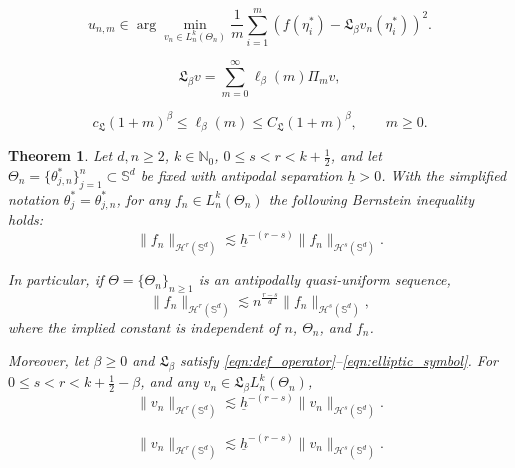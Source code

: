\documentclass[10pt,a4paper]{amsart}
\newtheorem{theorem}{Theorem}
\def\NN{\mathbb{N}}
\def\SS{\mathbb{S}}
\def\sul{\sum\limits}
\begin{document}
\begin{equation}\label{eqn_def_collocation}
u_{n,m}\in\arg\min_{v_n\in L_n^k(\Theta_n)}\frac1m\sum_{i=1}^m\left(f(\eta_i^*)-\mathfrak L_\beta v_n(\eta_i^*)\right)^2.
\end{equation}

\begin{equation}\label{eqn:def_operator}
\mathfrak L_\beta v=\sul_{m=0}^\infty\ell_\beta(m)\Pi_m v,
\end{equation}

\begin{equation}\label{eqn:elliptic_symbol}
c_{\mathfrak L}(1+m)^\beta\leq\ell_\beta(m)\leq C_{\mathfrak L}(1+m)^\beta,\qquad m\geq0.
\end{equation}

\begin{theorem}\label{thm:inverse}
    Let $d,n\geq2$, $k\in\NN_0$, $0\leq s<r< k+\frac{1}{2}$, and let $\Theta_n=\{\theta_{j,n}^*\}_{j=1}^n\subset\SS^d$ be fixed with antipodal separation $\underline h>0$. With the simplified notation $\theta_j^*=\theta_{j,n}^*$, for any $f_n\in L_n^k(\Theta_n)$ the following Bernstein inequality holds:
    \begin{equation}
        \|f_n\|_{\mathcal{H}^r(\SS^d)}\lesssim \underline{h}^{-(r-s)}\|f_n\|_{\mathcal{H}^s(\SS^d)}.
    \end{equation}
    
    In particular, if $\Theta=\{\Theta_n\}_{n\ge1}$ is an antipodally quasi-uniform sequence,
    \begin{equation}
        \|f_n\|_{\mathcal{H}^r(\SS^d)}\lesssim n^{\frac{r-s}{d}}\|f_n\|_{\mathcal{H}^s(\SS^d)},
    \end{equation}
    where the implied constant is independent of $n$, $\Theta_n$, and $f_n$.

    Moreover, let $\beta\geq0$ and $\mathfrak L_\beta$ satisfy \eqref{eqn:def_operator}--\eqref{eqn:elliptic_symbol}. For $0\leq s<r< k+\frac{1}{2}-\beta$, and any $v_n\in\mathfrak{L}_\beta L_n^k(\Theta_n)$,
    \begin{equation}\label{eqn:residual_bernstein}
\|v_n\|_{\mathcal H^r(\SS^d)}\lesssim\underline h^{-(r-s)}\|v_n\|_{\mathcal H^s(\SS^d)}.
\end{equation}

\end{theorem}

    \begin{equation}
\|v_n\|_{\mathcal H^r(\SS^d)}\lesssim\underline h^{-(r-s)}\|v_n\|_{\mathcal H^s(\SS^d)}.
\end{equation}
\end{document}
